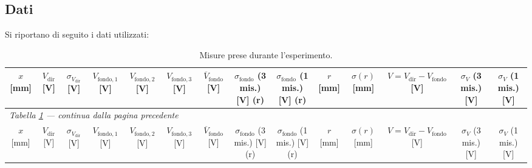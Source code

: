 \documentclass[10pt,twocolumn]{article}
\begin{document}
\onecolumn
\begin{landscape}
\section{Dati}
Si riportano di seguito i dati utilizzati:

\begingroup
\scriptsize
\setlength{\tabcolsep}{2pt}
\begin{longtable}{*{14}{c}}
\caption{Misure prese durante l'esperimento.}\label{tab:dati}\\
\toprule
\makecell{$x$\\{[mm]}} & \makecell{$V_\mathrm{dir}$\\{[V]}} & \makecell{$\sigma_{V_\mathrm{dir}}$\\{[V]}} & \makecell{$V_\mathrm{fondo,1}$\\{[V]}} & \makecell{$V_\mathrm{fondo,2}$\\{[V]}} & \makecell{$V_\mathrm{fondo,3}$\\{[V]}} & \makecell{$\overline{V}_\mathrm{fondo}$\\{[V]}} & \makecell{$\sigma_\mathrm{fondo}$ (3 mis.)\\{[V]} (r)} & \makecell{$\sigma_\mathrm{fondo}$ (1 mis.)\\{[V]} (r)} & \makecell{$r$\\{[mm]}} & \makecell{$\sigma(r)$\\{[mm]}} & \makecell{$V=V_\mathrm{dir}-V_\mathrm{fondo}$\\{[V]}} & \makecell{$\sigma_V$ (3 mis.)\\{[V]}} & \makecell{$\sigma_V$ (1 mis.)\\{[V]}} \\
\midrule
\endfirsthead
\multicolumn{14}{l}{\scriptsize\textit{Tabella \ref{tab:dati} --- continua dalla pagina precedente}}\\
\toprule
\makecell{$x$\\{[mm]}} & \makecell{$V_\mathrm{dir}$\\{[V]}} & \makecell{$\sigma_{V_\mathrm{dir}}$\\{[V]}} & \makecell{$V_\mathrm{fondo,1}$\\{[V]}} & \makecell{$V_\mathrm{fondo,2}$\\{[V]}} & \makecell{$V_\mathrm{fondo,3}$\\{[V]}} & \makecell{$\overline{V}_\mathrm{fondo}$\\{[V]}} & \makecell{$\sigma_\mathrm{fondo}$ (3 mis.)\\{[V]} (r)} & \makecell{$\sigma_\mathrm{fondo}$ (1 mis.)\\{[V]} (r)} & \makecell{$r$\\{[mm]}} & \makecell{$\sigma(r)$\\{[mm]}} & \makecell{$V=V_\mathrm{dir}-V_\mathrm{fondo}$\\{[V]}} & \makecell{$\sigma_V$ (3 mis.)\\{[V]}} & \makecell{$\sigma_V$ (1 mis.)\\{[V]}} \\

\end{longtable}
\end{landscape}
\end{document}
